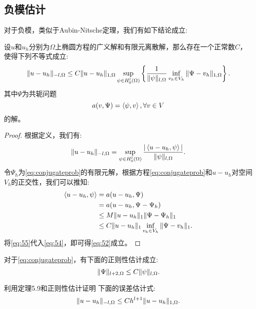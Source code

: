 \subsection{负模估计}
对于负模，类似于Aubin-Nitsche定理，我们有如下结论成立:
\begin{theorem}
    设$u$和$u_{h}$分别为$\Omega$上椭圆方程的广义解和有限元离散解，那么存在一个正常数$C$，使得下列不等式成立:
    \begin{equation}
        \label{eq:52}
        \|u-u_{h}\|_{-l,\Omega}\le C\|u-u_{h}\|_{1,\Omega}\sup_{\psi\in H_{0}^{l}(\Omega)}\left\{\frac{1}{\|\psi\|_{l,\Omega}}\inf_{v_{h}\in V_{h}}\|\Psi-v_{h}\|_{1,\Omega}\right\}.
    \end{equation}
    其中$\Psi$为共轭问题
    \begin{equation}
        \label{eq:conjugateprob}
        a(v,\Psi)=\left<\psi,v\right>,\forall v\in V
    \end{equation}
    的解。
\end{theorem}
\begin{proof}
    根据定义，我们有:
    \begin{equation}
        \label{eq:54}
        \|u-u_{h}\|_{-l,\Omega}=\sup_{\psi\in H_{0}^{l}(\Omega)}\frac{|\left<u-u_{h},\psi\right>|}{\|\psi\|_{l,\Omega}}.
    \end{equation}
    令$\Psi_{h}$为\eqref{eq:conjugateprob}的有限元解，根据方程\eqref{eq:conjugateprob}和$u-u_{h}$对空间$V_{h}$的正交性，我们可以推知:
    \begin{equation}
        \label{eq:55}
        \begin{aligned}
            \left<u-u_{h},\psi\right>&=a(u-u_{h},\Psi)\\
            &=a(u-u_{h},\Psi-\Psi_{h})\\
            &\le M\|u-u_{h}\|_{1}\|\Psi-\Psi_{h}\|_{1}\\
            &\le C\|u-u_{h}\|_{1}\inf_{v_{h}\in V_{h}}\|\Psi-v_{h}\|_{1}.
        \end{aligned}
    \end{equation}
    将\eqref{eq:55}代入\eqref{eq:54}，即可得\eqref{eq:52}成立。
\end{proof}
对于\eqref{eq:conjugateprob}，有下面的正则性估计成立:
\begin{equation}
    \|\Psi\|_{l+2,\Omega}\le C\|\psi\|_{l,\Omega}.
\end{equation}
\begin{exercise}
    利用定理5.9和正则性估计证明
    下面的误差估计式:
    \begin{equation}
        \|u-u_{h}\|_{-l,\Omega}\le Ch^{l+1}\|u-u_{h}\|_{1,\Omega}.
    \end{equation}
\end{exercise}
